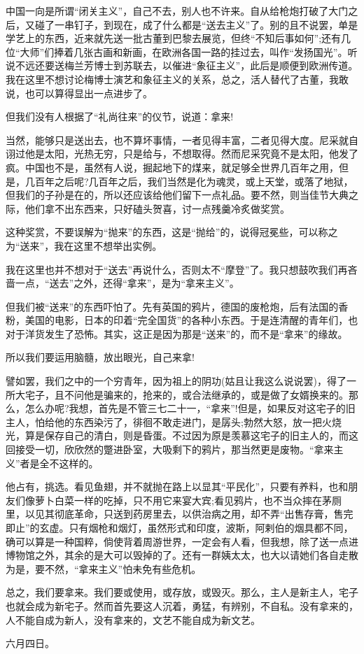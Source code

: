 
    中国一向是所谓“闭关主义”，自己不去，别人也不许来。自从给枪炮打破了大门之后，又碰了一串钉子，到现在，成了什么都是“送去主义”了。别的且不说罢，单是学艺上的东西，近来就先送一批古董到巴黎去展览，但终“不知后事如何”;还有几位“大师”们捧着几张古画和新画，在欧洲各国一路的挂过去，叫作“发扬国光”。听说不远还要送梅兰芳博士到苏联去，以催进“象征主义”，此后是顺便到欧洲传道。我在这里不想讨论梅博士演艺和象征主义的关系，总之，活人替代了古董，我敢说，也可以算得显出一点进步了。

    但我们没有人根据了“礼尚往来”的仪节，说道：拿来!

    当然，能够只是送出去，也不算坏事情，一者见得丰富，二者见得大度。尼采就自诩过他是太阳，光热无穷，只是给与，不想取得。然而尼采究竟不是太阳，他发了疯。中国也不是，虽然有人说，掘起地下的煤来，就足够全世界几百年之用，但是，几百年之后呢?几百年之后，我们当然是化为魂灵，或上天堂，或落了地狱，但我们的子孙是在的，所以还应该给他们留下一点礼品。要不然，则当佳节大典之际，他们拿不出东西来，只好磕头贺喜，讨一点残羹冷炙做奖赏。

    这种奖赏，不要误解为“抛来”的东西，这是“抛给”的，说得冠冕些，可以称之为“送来”，我在这里不想举出实例。

    我在这里也并不想对于“送去”再说什么，否则太不“摩登”了。我只想鼓吹我们再吝啬一点，“送去”之外，还得“拿来”，是为“拿来主义”。

    但我们被“送来”的东西吓怕了。先有英国的鸦片，德国的废枪炮，后有法国的香粉，美国的电影，日本的印着“完全国货”的各种小东西。于是连清醒的青年们，也对于洋货发生了恐怖。其实，这正是因为那是“送来”的，而不是“拿来”的缘故。

    所以我们要运用脑髓，放出眼光，自己来拿!

    譬如罢，我们之中的一个穷青年，因为祖上的阴功(姑且让我这么说说罢)，得了一所大宅子，且不问他是骗来的，抢来的，或合法继承的，或是做了女婿换来的。那么，怎么办呢?我想，首先是不管三七二十一，“拿来”!但是，如果反对这宅子的旧主人，怕给他的东西染污了，徘徊不敢走进门，是孱头;勃然大怒，放一把火烧光，算是保存自己的清白，则是昏蛋。不过因为原是羡慕这宅子的旧主人的，而这回接受一切，欣欣然的蹩进卧室，大吸剩下的鸦片，那当然更是废物。“拿来主义”者是全不这样的。

    他占有，挑选。看见鱼翅，并不就抛在路上以显其“平民化”，只要有养料，也和朋友们像萝卜白菜一样的吃掉，只不用它来宴大宾;看见鸦片，也不当众摔在茅厕里，以见其彻底革命，只送到药房里去，以供治病之用，却不弄“出售存膏，售完即止”的玄虚。只有烟枪和烟灯，虽然形式和印度，波斯，阿剌伯的烟具都不同，确可以算是一种国粹，倘使背着周游世界，一定会有人看，但我想，除了送一点进博物馆之外，其余的是大可以毁掉的了。还有一群姨太太，也大以请她们各自走散为是，要不然，“拿来主义”怕未免有些危机。

    总之，我们要拿来。我们要或使用，或存放，或毁灭。那么，主人是新主人，宅子也就会成为新宅子。然而首先要这人沉着，勇猛，有辨别，不自私。没有拿来的，人不能自成为新人，没有拿来的，文艺不能自成为新文艺。

    六月四日。